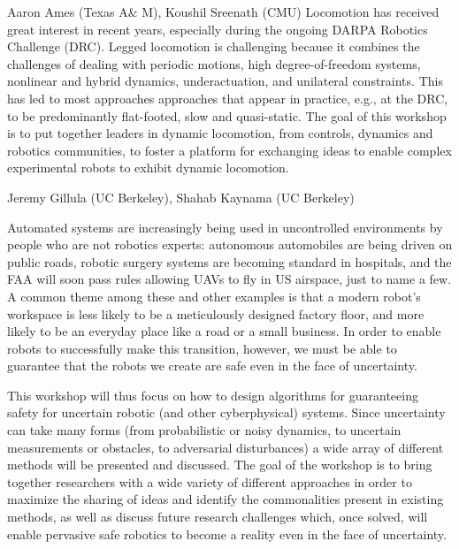 \begin{spacing}{1.0}
{Aaron Ames (Texas A\& M), Koushil Sreenath (CMU)}
{
Locomotion has received great interest in recent years, especially during the ongoing DARPA Robotics Challenge (DRC).  Legged locomotion is challenging because it combines the challenges of dealing with periodic motions, high degree-of-freedom systems, nonlinear and hybrid dynamics, underactuation, and unilateral constraints.  This has led to most approaches approaches that appear in practice, e.g., at the DRC, to be predominantly flat-footed, slow and quasi-static.  The goal of this workshop is to put together leaders in dynamic locomotion, from controls, dynamics and robotics communities, to foster a platform for exchanging ideas to enable complex experimental robots to exhibit dynamic locomotion.
}



{Jeremy Gillula (UC Berkeley), Shahab Kaynama (UC Berkeley)}
{
Automated systems are increasingly being used in uncontrolled environments by people who are not robotics experts: autonomous automobiles are being driven on public roads, robotic surgery systems are becoming standard in hospitals, and the FAA will soon pass rules allowing UAVs to fly in US airspace, just to name a few. A common theme among these and other examples is that a modern robot's workspace is less likely to be a meticulously designed factory floor, and more likely to be an everyday place like a road or a small business. In order to enable robots to successfully make this transition, however, we must be able to guarantee that the robots we create are safe even in the face of uncertainty.

This workshop will thus focus on how to design algorithms for guaranteeing safety for uncertain robotic (and other cyberphysical) systems. Since uncertainty can take many forms (from probabilistic or noisy dynamics, to uncertain measurements or obstacles, to adversarial disturbances) a wide array of different methods will be presented and discussed. The goal of the workshop is to bring together researchers with a wide variety of different approaches in order to maximize the sharing of ideas and identify the commonalities present in existing methods, as well as discuss future research challenges which, once solved, will enable pervasive safe robotics to become a reality even in the face of uncertainty.
}




\end{spacing}
